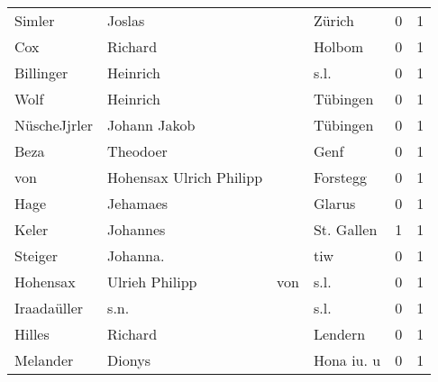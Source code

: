 \documentclass[10pt,a4paper,landscape]{article}
\begin{document}
\begin{longtable}{llllrr}
                   Simler &                             Joslas &             &                                      Zürich &          0 &         1 \\
                      Cox &                            Richard &             &                                      Holbom &          0 &         1 \\
                Billinger &                           Heinrich &             &                                        s.l. &          0 &         1 \\
                     Wolf &                           Heinrich &             &                                    Tübingen &          0 &         1 \\
             NüscheJjrler &                       Johann Jakob &             &                                    Tübingen &          0 &         1 \\
                     Beza &                           Theodoer &             &                                        Genf &          0 &         1 \\
                      von &            Hohensax Ulrich Philipp &             &                                    Forstegg &          0 &         1 \\
                     Hage &                           Jehamaes &             &                                      Glarus &          0 &         1 \\
                    Keler &                           Johannes &             &                                  St. Gallen &          1 &         1 \\
                  Steiger &                           Johanna. &             &                                         tiw &          0 &         1 \\
                 Hohensax &                     Ulrieh Philipp &         von &                                        s.l. &          0 &         1 \\
              Iraadaüller &                               s.n. &             &                                        s.l. &          0 &         1 \\
                   Hilles &                            Richard &             &                                     Lendern &          0 &         1 \\
                 Melander &                             Dionys &             &                                  Hona iu. u &          0 &         1 \\

\end{longtable}
\end{document}
